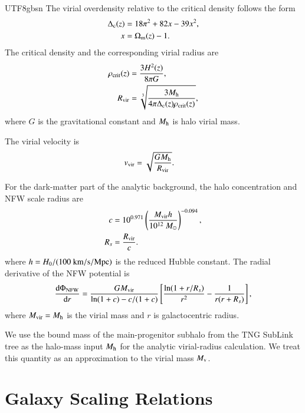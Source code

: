 \documentclass[trackchanges, twocolappendix, twocolumn]{aastex701}
\begin{document}
\begin{CJK*}{UTF8}{gbsn}
The virial overdensity relative to the critical density follows the \cite{Bryan&Norman1998DM} form
\begin{align}
\Delta_{\rm c} (z) & = 18 \pi^2 + 82 x - 39 x^2 , \\
x &= \Omega_{\rm m}(z)-1 .
\end{align}
The critical density and the corresponding virial radius are
\begin{align}
\rho_{\rm crit} (z) & = \dfrac{3 H^2 (z)}{8 \pi G} , \\
R_{\rm vir} & = \sqrt[3]{ \dfrac{3 M_{\rm h}}{4\pi \Delta_{\rm c} (z) \rho_{\rm crit} (z)} } ,
\end{align}
where $G$ is the gravitational constant and $M_{\rm h}$ is halo virial mass.

The virial velocity is
\begin{align}
v_{\rm vir} & = \sqrt{\dfrac{G M_{\rm h}}{R_{\rm vir}}} .
\end{align}

For the dark-matter part of the analytic background, the halo concentration \citep{Maccio+2008DM} and NFW \citep{Navarro&Frenk&White1997DM} scale radius are
\begin{align}
c & = 10^{0.971} \left( \dfrac{M_{\rm vir} h}{10^{12}~M_\odot} \right)^{-0.094},\\
R_s & = \dfrac{R_{\rm vir}}{c}.
\end{align}
where $h = H_0 / (100~{\rm km/s/Mpc})$ is the reduced Hubble constant. The radial derivative of the NFW potential is
\begin{align}
\dfrac{{\rm d}  \Phi_{\rm NFW}}{{\rm d}  r} = \dfrac{G M_{\rm vir}}{\ln (1 + c) - c / (1 + c)} \left[ \dfrac{\ln (1 + r / R_s)}{r^2} - \dfrac{1}{r (r + R_s)} \right] ,
\end{align}
where $M_{\rm vir} = M_{\rm h}$ is the virial mass and $r$ is galactocentric radius.

We use the bound mass of the main-progenitor subhalo from the TNG SubLink tree as the halo-mass input \(M_{\rm h}\) for the analytic virial-radius calculation. We treat this quantity as an approximation to the virial mass \(M_{\rm v}\).

\section{Galaxy Scaling Relations} \label{appendix:galaxy}


\end{CJK*}
\end{document}
